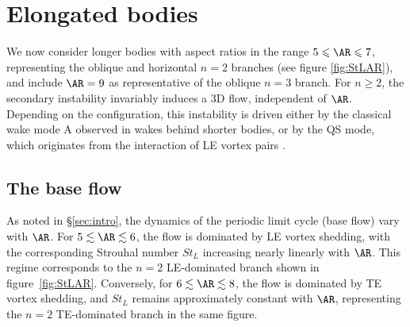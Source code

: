 \section{Elongated bodies}
\label{sec:elongated}

We now consider longer bodies with aspect ratios in the range $5 \le \AR \le 7$, representing the oblique and horizontal $n=2$ branches (see figure \ref{fig:StLAR}), and include $\AR=9$ as representative of the oblique $n=3$ branch. For $n \ge 2$, the secondary instability invariably induces a 3D flow, independent of $\AR$. Depending on the configuration, this instability is driven either by the classical wake mode A observed in wakes behind shorter bodies, or by the QS mode, which originates from the interaction of LE vortex pairs \citep{chiarini-quadrio-auteri-2022}.

\subsection{The base flow}

As noted in \S\ref{sec:intro}, the dynamics of the periodic limit cycle (base flow) vary with $\AR$. For $5 \lesssim \AR \lesssim 6$, the flow is dominated by LE vortex shedding, with the corresponding Strouhal number $St_L$ increasing nearly linearly with $\AR$. This regime corresponds to the $n=2$ LE-dominated branch shown in figure~\ref{fig:StLAR}. Conversely, for $6 \lesssim \AR \lesssim 8$, the flow is dominated by TE vortex shedding, and $St_L$ remains approximately constant with $\AR$, representing the $n=2$ TE-dominated branch in the same figure.

